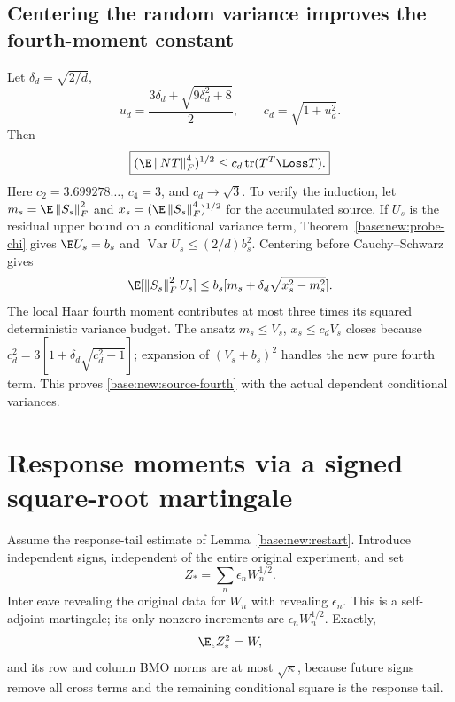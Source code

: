 \documentclass[11pt,oneside,openany,a4paper]{book}
\numberwithin{equation}{chapter}
\theoremstyle{definition}
\theoremstyle{remark}
\newcommand{\F}[1]{\left\lVert#1\right\rVert_F}
\DeclareMathOperator{\tr}{tr}\DeclareMathOperator{\rank}{rank}
\DeclareMathOperator{\Var}{Var}\DeclareMathOperator{\supp}{supp}
\begin{document}
\subsection{Centering the random variance improves the fourth-moment constant}
Let $\delta_d=\sqrt{2/d}$,
\[
 u_d=\frac{3\delta_d+\sqrt{9\delta_d^2+8}}2,
 \qquad c_d=\sqrt{1+u_d^2}.
\]
Then
\begin{equation}\label{base:new:source-fourth}
 \boxed{(\E\F{NT}^4)^{1/2}\le c_d\tr(T^T\Loss T).}
\end{equation}
Here $c_2=3.699278\ldots$, $c_4=3$, and $c_d\to\sqrt3$. To verify the induction, let $m_s=\E\F{S_s}^2$ and $x_s=(\E\F{S_s}^4)^{1/2}$ for the accumulated source. If $U_s$ is the residual upper bound on a conditional variance term, Theorem~\ref{base:new:probe-chi} gives $\E U_s=b_s$ and $\Var U_s\le(2/d)b_s^2$. Centering before Cauchy--Schwarz gives
\[
 \E[\F{S_s}^2U_s]\le
 b_s[m_s+\delta_d\sqrt{x_s^2-m_s^2}].
\]
The local Haar fourth moment contributes at most three times its squared deterministic variance budget. The ansatz $m_s\le V_s$, $x_s\le c_dV_s$ closes because
$c_d^2=3[1+\delta_d\sqrt{c_d^2-1}]$; expansion of $(V_s+b_s)^2$ handles the new pure fourth term. This proves \eqref{base:new:source-fourth} with the actual dependent conditional variances.

\section{Response moments via a signed square-root martingale}\label{base:new:response-moments}
Assume the response-tail estimate of Lemma~\ref{base:new:restart}. Introduce independent signs, independent of the entire original experiment, and set
\[
 Z_*=\sum_n\epsilon_nW_n^{1/2}.
\]
Interleave revealing the original data for $W_n$ with revealing $\epsilon_n$. This is a self-adjoint martingale; its only nonzero increments are $\epsilon_nW_n^{1/2}$. Exactly,
\[
 \E_\epsilon Z_*^2=W,
\]
and its row and column BMO norms are at most $\sqrt\kappa$, because future signs remove all cross terms and the remaining conditional square is the response tail.
\end{document}
